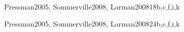 \begin{syllabus}
\begin{unit}{\SESoftwareDesign}{}{Pressman2005, Sommerville2008, Larman2008}{18}{b,c,f,i,k}
\begin{learningoutcomes}
			\item \SESoftwareDesignLOExplainHowMight [\Familiarity] %
			\item \SESoftwareDesignLODesignAA [\Usage] %
			\item \SESoftwareDesignLODiscussAnd [\Usage] %
			\item \SESoftwareDesignLOApplyModels [\Usage] %
			\item \SESoftwareDesignLOAnalyzeAFrom [\Assessment] %
			\item \SESoftwareDesignLOAnalyzeAFromOf [\Assessment] %
			\item \SESoftwareDesignLOExplainTheObjects [\Familiarity] %
			\item \SESoftwareDesignLOApplyComponent [\Usage] %
			\item \SESoftwareDesignLORefactorAn [\Usage] %
			\item \SESoftwareDesignLOStateAnd [\Familiarity] %
		\end{learningoutcomes}
	\end{unit}
	
	\begin{unit}{\SESoftwareConstruction}{}{Pressman2005, Sommerville2008, Larman2008}{24}{b,c,f,i,k}
		\begin{topics}
			\item \SESoftwareConstructionTopicCoding
			\item \SESoftwareConstructionTopicCodingStandards
			\item \SESoftwareConstructionTopicIntegration
			\item \SESoftwareConstructionTopicDevelopment
			\item \SESoftwareConstructionTopicPotential
		\end{topics}
	\begin{learningoutcomes}
			\item \SESoftwareConstructionLODescribeTechniques[\Assessment]
			\item \SESoftwareConstructionLOBuild[\Assessment]
			\item \SESoftwareConstructionLODescribeSecure[\Assessment]
			\item \SESoftwareConstructionLOSelectAndDefined[\Assessment]
			\item \SESoftwareConstructionLOCompareAndStrategies[\Assessment]
			\item \SESoftwareConstructionLODescribeTheAnalyzing[\Assessment]
			\item \SESoftwareConstructionLODescribeTheAnalyzingChanges[\Assessment]
			\item \SESoftwareConstructionLORewrite[\Assessment]
			\item \SESoftwareConstructionLOWriteAThatNon[\Assessment]
		\end{learningoutcomes}
	\end{unit}
	
	\begin{coursebibliography}
	\end{coursebibliography}
	
	\end{syllabus}
	
	
